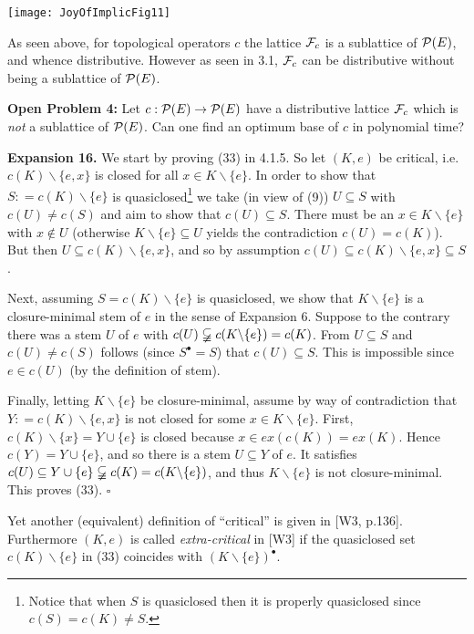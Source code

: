 \documentclass[11pt]{article}
\newcommand{\ra}{\rightarrow}
\begin{document}
\begin{center}
\texttt{[image: JoyOfImplicFig11]}
\end{center}

As seen above, for topological operators $c$ the lattice ${\cal F}_c$ is a sublattice of ${\cal P}(E)$, and whence distributive. However as seen in 3.1, ${\cal F}_c$ can be distributive without being a sublattice of ${\cal P}(E)$.

{\bf Open Problem 4:} Let $c : {\cal P}(E) \ra {\cal P}(E)$ have a distributive lattice ${\cal F}_c$ which is {\it not} a sublattice of ${\cal P}(E)$. Can one find an optimum base of $c$ in polynomial time?



{\bf Expansion 16.} We start by proving (33) in 4.1.5. So let $(K, e)$ be critical, i.e. $c(K)\backslash \{e, x\}$ is closed for all $x \in K \backslash \{e\}$. In order to show that $S: = c(K) \backslash \{e\}$ is quasiclosed\footnote{Notice that when $S$ is quasiclosed then it is properly quasiclosed since $c(S) =c(K) \neq S$.} we take (in view of (9)) $U \subseteq S$ with $c(U) \neq c(S)$ and aim to show that $c(U) \subseteq S$. There must be an $x \in K\backslash \{e\}$ with $x \not\in U$ (otherwise $K \backslash \{e\} \subseteq U$ yields the contradiction $c(U) = c(K)$). But then $U \subseteq c(K) \backslash \{e, x\}$, and so by assumption $c(U) \subseteq c(K) \backslash \{e, x\} \subseteq S$.

Next, assuming $S = c(K) \backslash \{e\}$ is quasiclosed, we show that $K \backslash \{e\}$ is a closure-minimal stem of $e$ in the sense of Expansion 6. Suppose to the contrary there was a stem $U$ of $e$ with $c(U) \varsubsetneqq c(K \backslash \{e\}) = c(K)$. From $U \subseteq S$ and $c(U) \neq c(S)$ follows (since $S^\bullet = S$) that $c(U) \subseteq S$. This is impossible since $e \in c(U)$ (by the definition of stem).

 Finally, letting $K \backslash \{e\}$ be closure-minimal, assume by way of contradiction that $Y : = c(K) \backslash \{e, x\}$ is not closed for some $x \in K \backslash \{e\}$. First, $c(K) \backslash \{x\} = Y\cup \{e\}$ is closed because $x \in ex(c(K)) = ex (K)$. Hence $c(Y) = Y \cup \{e\}$, and so there is a stem $U \subseteq Y$ of $e$. It satisfies $c(U) \subseteq Y \cup \{e\} \varsubsetneqq c(K) = c(K \backslash \{e\})$, and thus $K \backslash \{e\}$ is not closure-minimal.  This proves (33). \quad $\square$
 
 Yet another (equivalent) definition of ``critical'' is given in [W3, p.136]. Furthermore $(K, e)$ is called {\it extra-critical} in [W3] if the quasiclosed set $c(K) \backslash \{e\}$ in 
 (33) coincides with $(K \backslash \{e\})^\bullet$.
  
\end{document}

